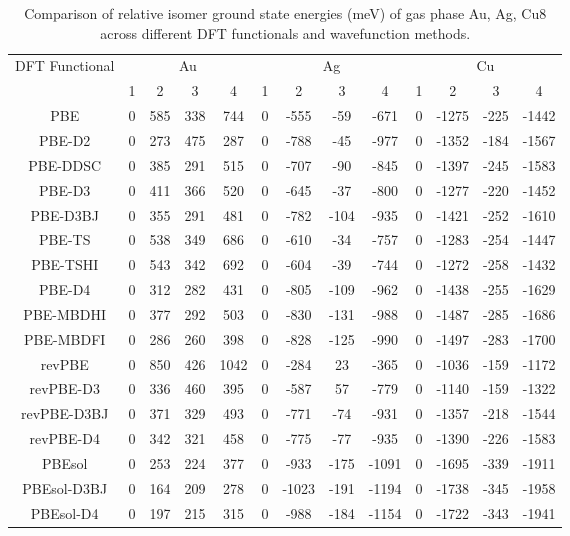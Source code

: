 \begin{table}[ht]
\centering
\caption{Comparison of relative isomer ground state energies (meV) of gas phase Au, Ag, Cu8 across different DFT functionals and wavefunction methods.}
\begin{tabular}{ccccccccccccc}
\hline\hline
DFT Functional & \multicolumn{4}{c}{Au} & \multicolumn{4}{c}{Ag} & \multicolumn{4}{c}{Cu} \\ 
\cline{2-13}
 & 1 & 2 & 3 & 4 & 1 & 2 & 3 & 4 & 1 & 2 & 3 & 4 \\ \hline
PBE & 0 & 585 & 338 & 744 & 0 & -555 & -59 & -671 & 0 & -1275 & -225 & -1442 \\ 
PBE-D2 & 0 & 273 & 475 & 287 & 0 & -788 & -45 & -977 & 0 & -1352 & -184 & -1567 \\ 
PBE-DDSC & 0 & 385 & 291 & 515 & 0 & -707 & -90 & -845 & 0 & -1397 & -245 & -1583 \\ 
PBE-D3 & 0 & 411 & 366 & 520 & 0 & -645 & -37 & -800 & 0 & -1277 & -220 & -1452 \\ 
PBE-D3BJ & 0 & 355 & 291 & 481 & 0 & -782 & -104 & -935 & 0 & -1421 & -252 & -1610 \\ 
PBE-TS & 0 & 538 & 349 & 686 & 0 & -610 & -34 & -757 & 0 & -1283 & -254 & -1447 \\ 
PBE-TSHI & 0 & 543 & 342 & 692 & 0 & -604 & -39 & -744 & 0 & -1272 & -258 & -1432 \\ 
PBE-D4 & 0 & 312 & 282 & 431 & 0 & -805 & -109 & -962 & 0 & -1438 & -255 & -1629 \\ 
PBE-MBDHI & 0 & 377 & 292 & 503 & 0 & -830 & -131 & -988 & 0 & -1487 & -285 & -1686 \\ 
PBE-MBDFI & 0 & 286 & 260 & 398 & 0 & -828 & -125 & -990 & 0 & -1497 & -283 & -1700 \\ 
revPBE & 0 & 850 & 426 & 1042 & 0 & -284 & 23 & -365 & 0 & -1036 & -159 & -1172 \\ 
revPBE-D3 & 0 & 336 & 460 & 395 & 0 & -587 & 57 & -779 & 0 & -1140 & -159 & -1322 \\ 
revPBE-D3BJ & 0 & 371 & 329 & 493 & 0 & -771 & -74 & -931 & 0 & -1357 & -218 & -1544 \\ 
revPBE-D4 & 0 & 342 & 321 & 458 & 0 & -775 & -77 & -935 & 0 & -1390 & -226 & -1583 \\ 
PBEsol & 0 & 253 & 224 & 377 & 0 & -933 & -175 & -1091 & 0 & -1695 & -339 & -1911 \\ 
PBEsol-D3BJ & 0 & 164 & 209 & 278 & 0 & -1023 & -191 & -1194 & 0 & -1738 & -345 & -1958 \\ 
PBEsol-D4 & 0 & 197 & 215 & 315 & 0 & -988 & -184 & -1154 & 0 & -1722 & -343 & -1941 \\ 

\end{tabular}
\end{table}
